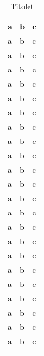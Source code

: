 \begin{longtable}{|X|X|X|}
a & b & c\\
\hline
a & b & c\\
\hline
a & b & c\\
\hline
a & b & c\\
\hline
a & b & c\\
\hline
a & b & c\\
\hline
a & b & c\\
\hline
a & b & c\\
\hline
a & b & c\\
\hline
a & b & c\\
\hline
a & b & c\\
\hline
a & b & c\\
\hline
a & b & c\\
\hline
a & b & c\\
\hline
a & b & c\\
\hline
a & b & c\\
\hline
a & b & c\\
\hline
a & b & c\\
\hline
a & b & c\\
\hline
a & b & c\\
\hline
a & b & c\\
\hline
a & b & c\\
\hline
a & b & c\\
\hline
\caption{Titolet}   %
\end{longtable}
